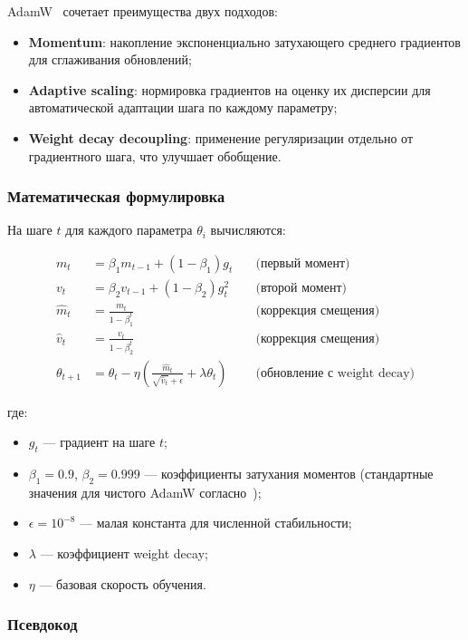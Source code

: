 \documentclass[a4paper,12pt]{article}
\begin{document}
AdamW~\cite{loshchilov2019adamw} сочетает преимущества двух подходов:
\begin{itemize}
    \item \textbf{Momentum}: накопление экспоненциально затухающего среднего градиентов для сглаживания обновлений;
    \item \textbf{Adaptive scaling}: нормировка градиентов на оценку их дисперсии для автоматической адаптации шага по каждому параметру;
    \item \textbf{Weight decay decoupling}: применение регуляризации отдельно от градиентного шага, что улучшает обобщение.
\end{itemize}

\subsubsection{Математическая формулировка}

На шаге $t$ для каждого параметра $\theta_i$ вычисляются:

\begin{align}
    m_t &= \beta_1 m_{t-1} + (1 - \beta_1) g_t \quad &\text{(первый момент)} \\
    v_t &= \beta_2 v_{t-1} + (1 - \beta_2) g_t^2 \quad &\text{(второй момент)} \\
    \hat{m}_t &= \frac{m_t}{1 - \beta_1^t} \quad &\text{(коррекция смещения)} \\
    \hat{v}_t &= \frac{v_t}{1 - \beta_2^t} \quad &\text{(коррекция смещения)} \\
    \theta_{t+1} &= \theta_t - \eta \left( \frac{\hat{m}_t}{\sqrt{\hat{v}_t} + \epsilon} + \lambda \theta_t \right) \quad &\text{(обновление с weight decay)}
\end{align}

где:
\begin{itemize}
    \item $g_t$ --- градиент на шаге $t$;
    \item $\beta_1 = 0.9$, $\beta_2 = 0.999$ --- коэффициенты затухания моментов (стандартные значения для чистого AdamW согласно~\cite{loshchilov2019adamw});
    \item $\epsilon = 10^{-8}$ --- малая константа для численной стабильности;
    \item $\lambda$ --- коэффициент weight decay;
    \item $\eta$ --- базовая скорость обучения.
\end{itemize}

\subsubsection{Псевдокод}
\end{document}
